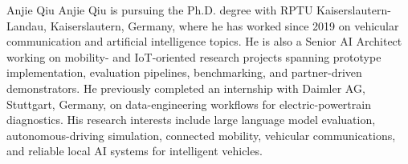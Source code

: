 \begin{IEEEbiographynophoto}{Anjie Qiu}
Anjie Qiu is pursuing the Ph.D. degree with RPTU Kaiserslautern-Landau, Kaiserslautern, Germany, where he has worked since 2019 on vehicular communication and artificial intelligence topics. He is also a Senior AI Architect working on mobility- and IoT-oriented research projects spanning prototype implementation, evaluation pipelines, benchmarking, and partner-driven demonstrators. He previously completed an internship with Daimler AG, Stuttgart, Germany, on data-engineering workflows for electric-powertrain diagnostics. His research interests include large language model evaluation, autonomous-driving simulation, connected mobility, vehicular communications, and reliable local AI systems for intelligent vehicles.
\end{IEEEbiographynophoto}
